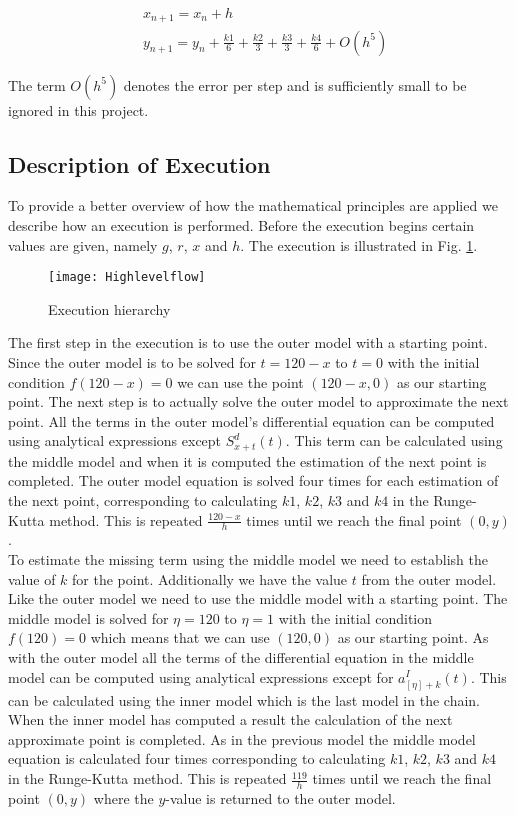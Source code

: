 \begin{align}
\nonumber& x_{n + 1} = x_n + h \\
&y_{n + 1} = y_n + \frac{k1}{6} + \frac{k2}{3} + \frac{k3}{3} + \frac{k4}{6} + O(h^5)
\end{align}

The term $O(h^5)$ denotes the error per step and is sufficiently small to be ignored in this project.

\subsection{Description of Execution}
	To provide a better overview of how the mathematical principles are applied we describe how an execution is performed. Before the execution begins certain values are given, namely $g$, $r$, $x$ and $h$. The execution is illustrated in Fig. \ref{fig:mathexecution}. \\
	
	\begin{figure}[ht!]
	  \centering
	    \texttt{[image: Highlevelflow]}
	  \caption{Execution hierarchy}
	  \label{fig:mathexecution}
	\end{figure}
	
	The first step in the execution is to use the outer model with a starting point. Since the outer model is to be solved for $t=120-x$ to $t=0$ with the initial condition $f(120-x)=0$ we can use the point $(120-x, 0)$ as our starting point. The next step is to actually solve the outer model to approximate the next point. All the terms in the outer model's differential equation can be computed using analytical expressions except $S_{x+t}^d (t)$. This term can be calculated using the middle model and when it is computed the estimation of the next point is completed. The outer model equation is solved four times for each estimation of the next point, corresponding to calculating $k1$, $k2$, $k3$ and $k4$ in the Runge-Kutta method. This is repeated $\frac{120-x}{h}$ times until we reach the final point $(0,y)$. \\
	
	To estimate the missing term using the middle model we need to establish the value of $k$ for the point. Additionally we have the value $t$ from the outer model. Like the outer model we need to use the middle model with a starting point. The middle model is solved for $\eta = 120$ to $\eta = 1$ with the initial condition $f(120) = 0$ which means that we can use $(120,0)$ as our starting point. As with the outer model all the terms of the differential equation in the middle model can be computed using analytical expressions except for $a_{[\eta]+k}^I(t)$. This can be calculated using the inner model which is the last model in the chain. When the inner model has computed a result the calculation of the next approximate point is completed. As in the previous model the middle model equation is calculated four times corresponding to calculating $k1$, $k2$, $k3$ and $k4$ in the Runge-Kutta method. This is repeated $\frac{119}{h}$ times until we reach the final point $(0,y)$ where the $y$-value is returned to the outer model. \\
	

